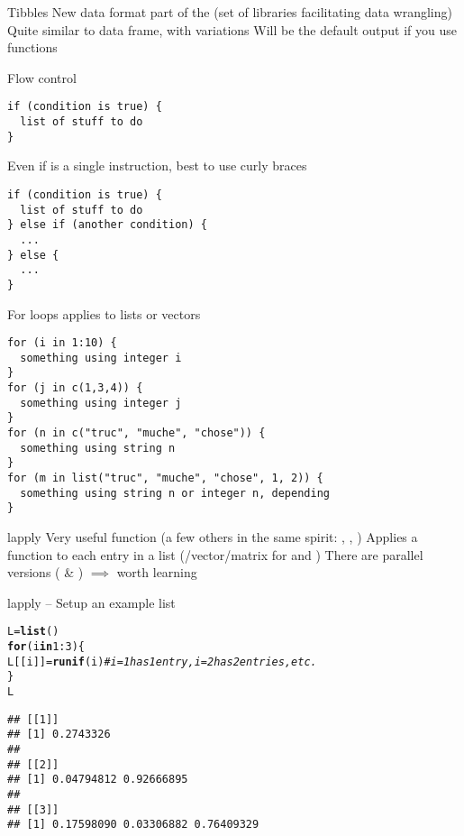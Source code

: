 \documentclass[aspectratio=169]{beamer}\usepackage[]{graphicx}\usepackage[]{xcolor}
\makeatletter
\newcommand{\hlnum}[1]{\textcolor[rgb]{0.686,0.059,0.569}{#1}}%
\newcommand{\hlcom}[1]{\textcolor[rgb]{0.678,0.584,0.686}{\textit{#1}}}%
\newcommand{\hlopt}[1]{\textcolor[rgb]{0,0,0}{#1}}%
\newcommand{\hldef}[1]{\textcolor[rgb]{0.345,0.345,0.345}{#1}}%
\newcommand{\hlkwa}[1]{\textcolor[rgb]{0.161,0.373,0.58}{\textbf{#1}}}%
\newcommand{\hlkwb}[1]{\textcolor[rgb]{0.69,0.353,0.396}{#1}}%
\newcommand{\hlkwd}[1]{\textcolor[rgb]{0.737,0.353,0.396}{\textbf{#1}}}%
\newenvironment{kframe}{%
 \def\at@end@of@kframe{}%
 \ifinner\ifhmode%
  \def\at@end@of@kframe{\end{minipage}}%
  \begin{minipage}{\columnwidth}%
 \fi\fi%
 \def\FrameCommand##1{\hskip\@totalleftmargin \hskip-\fboxsep
 \colorbox{shadecolor}{##1}\hskip-\fboxsep
     \hskip-\linewidth \hskip-\@totalleftmargin \hskip\columnwidth}%
 \MakeFramed {\advance\hsize-\width
   \@totalleftmargin\z@ \linewidth\hsize
   \@setminipage}}%
 {\par\unskip\endMakeFramed%
 \at@end@of@kframe}
\newenvironment{knitrout}{}{} %
\makeatother
\begin{document}
\begin{frame}{Tibbles}
\bbullet
New data format part of the  (set of libraries facilitating data wrangling)
\vfill
\bbullet
Quite similar to data frame, with variations
\vfill
\bbullet Will be the default output if you use  functions
\end{frame}


\begin{frame}[fragile]{Flow control}
\begin{lstlisting}
if (condition is true) {
  list of stuff to do
}
\end{lstlisting}
Even if  is a single instruction, best to use curly braces
\begin{lstlisting}
if (condition is true) {
  list of stuff to do
} else if (another condition) {
  ...
} else {
  ...
}
\end{lstlisting}
\end{frame} 

\begin{frame}[fragile]{For loops}
 applies to lists or vectors
\begin{lstlisting}
for (i in 1:10) {
  something using integer i
}
for (j in c(1,3,4)) {
  something using integer j
}
for (n in c("truc", "muche", "chose")) {
  something using string n
}
for (m in list("truc", "muche", "chose", 1, 2)) {
  something using string n or integer n, depending
}
\end{lstlisting}
\end{frame} 

\begin{frame}[fragile]{lapply}
Very useful function (a few others in the same spirit: , , )
\vfill
Applies a function to each entry in a list (/vector/matrix for  and )
\vfill
There are parallel versions ( \& ) $\implies$ worth learning
\end{frame}

\begin{frame}[fragile]{lapply -- Setup an example list}
\begin{knitrout}
\color{fgcolor}\begin{kframe}
\begin{alltt}
\hldef{L} \hlkwb{=} \hlkwd{list}\hldef{()}
\hlkwa{for} \hldef{(i} \hlkwa{in} \hlnum{1}\hlopt{:}\hlnum{3}\hldef{) \{}
        \hldef{L[[i]]} \hlkwb{=} \hlkwd{runif}\hldef{(i)} \hlcom{# i=1 has 1 entry, i=2 has 2 entries, etc.}
\hldef{\}}
\hldef{L}
\end{alltt}
\begin{verbatim}
## [[1]]
## [1] 0.2743326
## 
## [[2]]
## [1] 0.04794812 0.92666895
## 
## [[3]]
## [1] 0.17598090 0.03306882 0.76409329
\end{verbatim}
\end{kframe}
\end{knitrout}
\end{frame}
\end{document}
